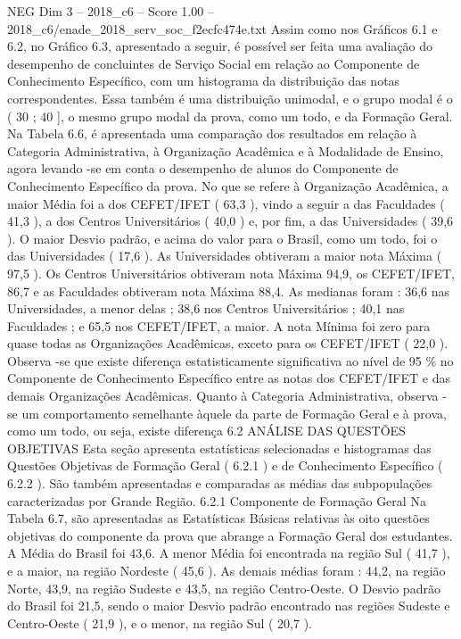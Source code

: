 \begin{textsample}{NEG Dim 3 – 2018\_c6 – Score 1.00 – 2018\_c6/enade\_2018\_serv\_soc\_f2ecfc474e.txt}
Assim como nos Gráficos 6.1 e 6.2, no Gráfico 6.3, apresentado a seguir, é possível ser feita uma avaliação do desempenho de concluintes de Serviço Social em relação ao Componente de Conhecimento Específico, com um histograma da distribuição das notas correspondentes.
Essa também é uma distribuição unimodal, e o grupo modal é o ( 30 ; 40 ], o mesmo grupo modal da prova, como um todo, e da Formação Geral.
Na Tabela 6.6, é apresentada uma comparação dos resultados em relação à Categoria Administrativa, à Organização Acadêmica e à Modalidade de Ensino, agora levando -se em conta o desempenho de alunos do Componente de Conhecimento Específico da prova.
No que se refere à Organização Acadêmica, a maior Média foi a dos CEFET/IFET ( 63,3 ), vindo a seguir a das Faculdades ( 41,3 ), a dos Centros Universitários ( 40,0 ) e, por fim, a das Universidades ( 39,6 ).
O maior Desvio padrão, e acima do valor para o Brasil, como um todo, foi o das Universidades ( 17,6 ).
As Universidades obtiveram a maior nota Máxima ( 97,5 ).
Os Centros Universitários obtiveram nota Máxima 94,9, os CEFET/IFET, 86,7 e as Faculdades obtiveram nota Máxima 88,4.
As medianas foram : 36,6 nas Universidades, a menor delas ; 38,6 nos Centros Universitários ; 40,1 nas Faculdades ; e 65,5 nos CEFET/IFET, a maior.
A nota Mínima foi zero para quase todas as Organizações Acadêmicas, exceto para os CEFET/IFET ( 22,0 ).
Observa -se que existe diferença estatisticamente significativa ao nível de 95 \% no Componente de Conhecimento Específico entre as notas dos CEFET/IFET e das demais Organizações Acadêmicas.
Quanto à Categoria Administrativa, observa -se um comportamento semelhante àquele da parte de Formação Geral e à prova, como um todo, ou seja, existe diferença 6.2 ANÁLISE DAS QUESTÕES OBJETIVAS Esta seção apresenta estatísticas selecionadas e histogramas das Questões Objetivas de Formação Geral ( 6.2.1 ) e de Conhecimento Específico ( 6.2.2 ).
São também apresentadas e comparadas as médias das subpopulações caracterizadas por Grande Região. 6.2.1 Componente de Formação Geral Na Tabela 6.7, são apresentadas as Estatísticas Básicas relativas às oito questões objetivas do componente da prova que abrange a Formação Geral dos estudantes.
A Média do Brasil foi 43,6.
A menor Média foi encontrada na região Sul ( 41,7 ), e a maior, na região Nordeste ( 45,6 ).
As demais médias foram : 44,2, na região Norte, 43,9, na região Sudeste e 43,5, na região Centro-Oeste.
O Desvio padrão do Brasil foi 21,5, sendo o maior Desvio padrão encontrado nas regiões Sudeste e Centro-Oeste ( 21,9 ), e o menor, na região Sul ( 20,7 ).

\end{textsample}

